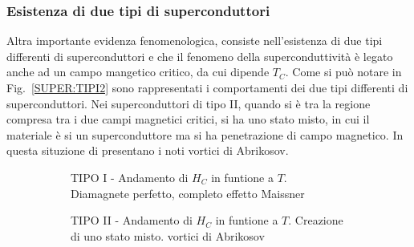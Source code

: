 \subsubsection{Esistenza di due tipi di superconduttori}
Altra importante evidenza fenomenologica, consiste nell'esistenza di due tipi differenti di superconduttori e che il fenomeno della superconduttivit\`a \`e legato anche ad un campo mangetico critico, da cui dipende $T_C$.
Come si pu\`o notare in Fig.~\ref{SUPER:TIPI2} sono rappresentati i comportamenti dei due tipi differenti di superconduttori. Nei superconduttori di tipo II, quando si \`e tra la regione compresa tra i due campi magnetici critici, si ha uno stato misto, in cui il materiale \`e si un superconduttore ma si ha penetrazione di campo magnetico. In questa situzione di presentano i noti vortici di Abrikosov. 
\begin{figure}
	\centering
	\begin{subfigure}[b]{0.4\textwidth}
	\caption{TIPO I - Andamento di $H_C$ in funtione a $T$. Diamagnete perfetto, completo effetto Maissner}
	\end{subfigure}
	\qquad\quad
	\begin{subfigure}[b]{0.4\textwidth}
	\caption{TIPO II - Andamento di $H_C$ in funtione a $T$. Creazione di uno stato misto. vortici di Abrikosov}
	\end{subfigure}
	\qquad\quad
        \begin{subfigure}[b]{0.4\textwidth}
\end{subfigure}
\end{figure}
